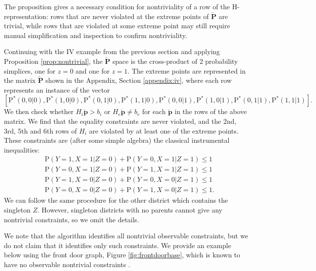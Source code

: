 \documentclass[12pt]{article}
\def\Pr{{\mathrm{P}}}
\def\Pdo{{\mathrm{P}^*}}
\begin{document}
The proposition gives a necessary condition for nontriviality of a row of the H-representation: rows that are never violated at the extreme points of $\boldsymbol{\check{P}}$ are trivial, while rows that are violated at some extreme point may still require manual simplification and inspection to confirm nontriviality.

Continuing with the IV example from the previous section and applying Proposition \ref{prop:nontrivial}, the $\boldsymbol{\check{P}}$ space is the cross-product of 2 probability simplices, one for $z = 0$ and one for $z = 1$. The extreme points are represented in the matrix $\boldsymbol{\check{P}}$ shown in the Appendix, Section \ref{appendix:iv}, where each row represents an instance of the vector 
\[
[\Pdo(0, 0 | 0), \Pdo(1, 0 | 0), \Pdo(0, 1 | 0), \Pdo(1, 1 | 0), \Pdo(0, 0 | 1), \Pdo(1, 0 | 1), \Pdo(0, 1 | 1), \Pdo(1, 1 | 1)]. 
\]
We then check whether $H_i \boldsymbol{\check{p}} > b_i$ or $H_e \boldsymbol{\check{p}} \neq b_e$ for each $\boldsymbol{\check{p}}$ in the rows of the above matrix. We find that the equality constraints are never violated, and the 2nd, 3rd, 5th and 6th rows of $H_i$ are violated by at least one of the extreme points. These constraints are (after some simple algebra) the classical instrumental inequalities: 
\begin{align*}
 & \Pr(Y = 1,X = 1|Z = 0) + \Pr(Y = 0,X = 1|Z = 1) \leq 1 \\
& \Pr(Y = 0,X = 1|Z = 0) + \Pr(Y = 1,X = 1|Z = 1)  \leq 1 \\
& \Pr(Y = 1,X = 0|Z = 0) + \Pr(Y = 0,X = 0|Z = 1) \leq 1 \\
& \Pr(Y = 0,X = 0|Z = 0) + \Pr(Y = 1,X = 0|Z = 1) \leq 1.  
\end{align*}
We can follow the same procedure for the other district which contains the singleton $Z$. However, singleton districts with no parents cannot give any nontrivial constraints, so we omit the details. 


We note that the algorithm identifies all nontrivial observable constraints, but we do not claim that it identifies only such constraints. We provide an example below using the front door graph, Figure \ref{fig:frontdoorbase}, which is known to have no observable nontrivial constraints \citep{pearl1995testability}. 
\end{document}
